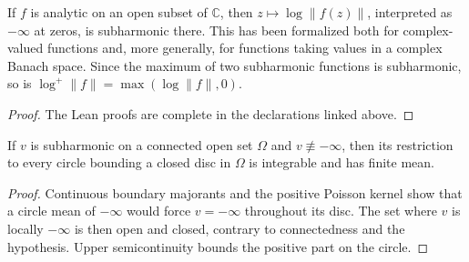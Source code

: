\begin{theorem}
  \label{thm:log_abs_subharmonic}
  \leanok
  If $f$ is analytic on an open subset of $\mathbb{C}$, then
  $z\mapsto \log \lVert f(z)\rVert$, interpreted as $-\infty$ at zeros, is
  subharmonic there. This has been formalized both for complex-valued
  functions and, more generally, for functions taking values in a complex
  Banach space. Since the maximum of two subharmonic functions is
  subharmonic, so is $\log^+\lVert f\rVert=\max(\log\lVert f\rVert,0)$.
  \begin{proof}
    \leanok
    The Lean proofs are complete in the declarations linked above.
  \end{proof}
\end{theorem}

\begin{corollary}
  \label{cor:I_6_4}
  \leanok
  If $v$ is subharmonic on a connected open set $\Omega$ and
  $v\not\equiv-\infty$, then its restriction to every circle bounding a
  closed disc in $\Omega$ is integrable and has finite mean.
  \begin{proof}
    \notready
    Continuous boundary majorants and the positive Poisson kernel show that
    a circle mean of $-\infty$ would force $v=-\infty$ throughout its disc.
    The set where $v$ is locally $-\infty$ is then open and closed, contrary
    to connectedness and the hypothesis. Upper semicontinuity bounds the
    positive part on the circle.
  \end{proof}
\end{corollary}

